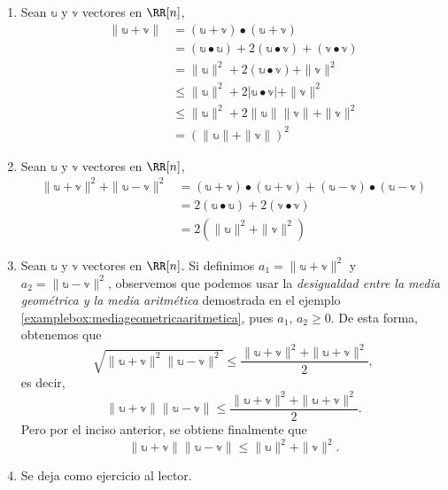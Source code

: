 \begin{theorem}{}{}
    \tcblower
    \demostracion
    \begin{enumerate}[label=\roman*), topsep=6pt, itemsep=0pt]
        \item Sean $\mathbb{u}$ y $\mathbb{v}$ vectores en $\RR[n]$,
        \begin{align*}
            \| \mathbb{u} + \mathbb{v} \| & = (\mathbb{u} + \mathbb{v}) \bullet (\mathbb{u} + \mathbb{v}) \\
            & = (\mathbb{u} \bullet \mathbb{u}) + 2(\mathbb{u} \bullet \mathbb{v}) + (\mathbb{v} \bullet \mathbb{v}) \\
            & = \| \mathbb{u} \|^2 + 2(\mathbb{u} \bullet \mathbb{v}) + \| \mathbb{v} \|^2 \\
            & \leq \| \mathbb{u} \|^2 + 2|\mathbb{u} \bullet \mathbb{v}| + \| \mathbb{v} \|^2 \\
            & \leq \| \mathbb{u} \|^2 + 2 \| \mathbb{u} \| \| \mathbb{v} \| + \| \mathbb{v} \|^2 \\
            & = (\| \mathbb{u} \| + \| \mathbb{v} \|)^2
        \end{align*}
        \item Sean $\mathbb{u}$ y $\mathbb{v}$ vectores en $\RR[n]$,
        \begin{align*}
            \| \mathbb{u} + \mathbb{v} \|^2 + \| \mathbb{u} - \mathbb{v} \|^2 & = (\mathbb{u} + \mathbb{v}) \bullet (\mathbb{u} + \mathbb{v}) + (\mathbb{u} - \mathbb{v}) \bullet (\mathbb{u} - \mathbb{v}) \\
            & = 2(\mathbb{u} \bullet \mathbb{u}) + 2(\mathbb{v} \bullet \mathbb{v}) \\
            & = 2 \left( \| \mathbb{u} \|^2 + \| \mathbb{v} \|^2 \right)
        \end{align*}
        \item Sean $\mathbb{u}$ y $\mathbb{v}$ vectores en $\RR[n]$. Si definimos $a_1 = \| \mathbb{u} + \mathbb{v} \|^2$ y $a_2 = \| \mathbb{u} - \mathbb{v} \|^2$, observemos que podemos usar la \emph{desigualdad entre la media geométrica y la media aritmética} demostrada en el ejemplo \ref{examplebox:mediageometricaaritmetica}, pues $a_1$, $a_2 \geq 0$. De esta forma, obtenemos que
        $$\sqrt{\| \mathbb{u} + \mathbb{v} \|^2 \| \mathbb{u} - \mathbb{v} \|^2} \leq \frac{\| \mathbb{u} + \mathbb{v} \|^2 + \| \mathbb{u} + \mathbb{v} \|^2}{2},$$
        es decir,
        $$\| \mathbb{u} + \mathbb{v} \| \| \mathbb{u} - \mathbb{v} \| \leq \frac{\| \mathbb{u} + \mathbb{v} \|^2 + \| \mathbb{u} + \mathbb{v} \|^2}{2}.$$
        Pero por el inciso anterior, se obtiene finalmente que
        $$\| \mathbb{u} + \mathbb{v} \| \| \mathbb{u} - \mathbb{v} \| \leq \| \mathbb{u} \|^2 + \| \mathbb{v} \|^2.$$
        \item Se deja como ejercicio al lector.
    \end{enumerate}
\end{theorem}

